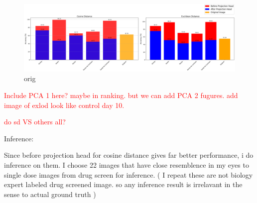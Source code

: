 \begin{figure}[H]
    \centering
    \includegraphics[scale=0.37]{figures/cluster.png} 
    \caption{orig}
    \label{fig:cluster}
\end{figure}



\textcolor{red}{Include PCA 1 here? maybe in ranking. but we can add PCA 2 fugures.}
\textcolor{red}{add image of exlod look like control day 10.}

\textcolor{red}{do sd VS others all?}

Inference:

Since before projection head for cosine distance gives far better performance, i do  inference on them. I choose 22 images that have close resemblence in my eyes 
to single dose images from drug screen for inference. ( I repeat these are not biology expert labeled drug screened image. so any inference result is irrelavant
 in the sense to actual ground truth )

 \begin{table}[H]
    \centering
    \caption{Evaluation Results on COSINE}
    \label{tab:professional_table}
\end{table}



